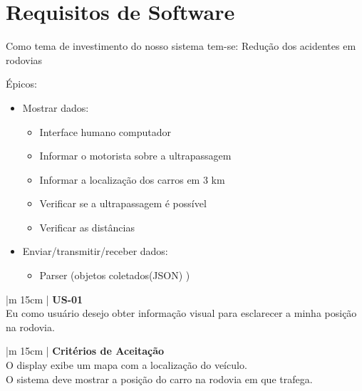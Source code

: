 \chapter[Requisitos de Software]{Requisitos de Software}

Como tema de investimento do nosso sistema tem-se: Redução dos acidentes em rodovias

Épicos:

\begin{itemize}
  \item Mostrar dados:
  \begin{itemize}
    \item Interface humano computador
    \item Informar o motorista sobre a ultrapassagem
    \item Informar a localização dos carros em 3 km
    \item Verificar se a ultrapassagem é possível
    \item Verificar as distâncias
  \end{itemize}

  \item Enviar/transmitir/receber dados:
  \begin{itemize}
    \item Parser  (objetos coletados(JSON) )
  \end{itemize}
\end{itemize}

\begin{table}[ht]
\caption{User Store - 01}
\centering
\begin{tabular}{|m {15cm} |}
\hline
\textbf{US-01} \\
\hline
Eu como usuário desejo obter informação visual para esclarecer a minha posição
na rodovia. \\
\hline
\end{tabular}
\label{table:us01}
\end{table}

\begin{table}[ht]
\caption{Critérios de Aceitaração para User Store - 01}
\centering
\begin{tabular}{|m {15cm} |}
\hline
\textbf{Critérios de Aceitação} \\
\hline
O display exibe um mapa com a localização do veículo.\\
\hline
O sistema deve mostrar a posição do carro na rodovia em que trafega. \\
\hline
\end{tabular}
\label{table:cus01}
\end{table}


